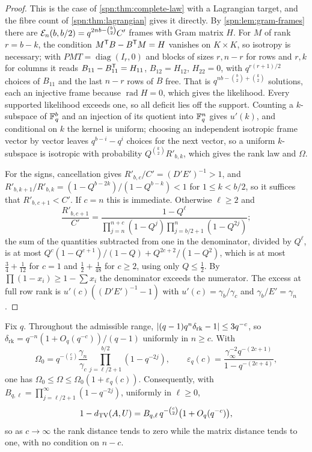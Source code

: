 \begin{proof}
This is the case of \cref{spn:thm:complete-law} with a Lagrangian target, and the fibre count of
\cref{spn:thm:lagrangian} gives it directly. By \cref{spn:lem:gram-frames} there are
$\mathcal{E}_n(b,b/2)=q^{2nb-\binom b2}C'$ frames with Gram matrix $H$. For $M$ of rank $r=b-k$, the
condition $M^{\mathsf{T}}B-B^{\mathsf{T}}M=H$ vanishes on $K\times K$, so isotropy is necessary; with
$PMT=\operatorname{diag}(I_r,0)$ and blocks of sizes $r,n-r$ for rows and $r,k$ for columns it reads
$B_{11}-B_{11}^{\mathsf{T}}=H_{11}$, $B_{12}=H_{12}$, $H_{22}=0$, with $q^{r(r+1)/2}$ choices of $B_{11}$ and
the last $n-r$ rows of $B$ free. That is $q^{nb-\binom b2+\binom k2}$ solutions, each an injective frame
because $\operatorname{rad}H=0$, which gives the likelihood. Every supported likelihood exceeds one, so
all deficit lies off the support. Counting a $k$-subspace of $\mathbb{F}_q^b$ and an injection of its quotient
into $\mathbb{F}_q^n$ gives $u'(k)$, and conditional on $k$ the kernel is uniform; choosing an independent
isotropic frame vector by vector leaves $q^{b-i}-q^i$ choices for the next vector, so a uniform
$k$-subspace is isotropic with probability $Q^{\binom k2}R'_{b,k}$, which gives the rank law and
$\Omega$.

For the signs, cancellation gives $R'_{b,c}/C'=(D'E')^{-1}>1$, and
$R'_{b,k+1}/R'_{b,k}=(1-Q^{b-2k})/(1-Q^{b-k})<1$ for $1\le k<b/2$, so it suffices that
$R'_{b,c+1}<C'$. If $c=n$ this is immediate. Otherwise $\ell\ge2$ and
\[
 \frac{R'_{b,c+1}}{C'}=\frac{1-Q^{\ell}}{\prod_{j=n}^{n+c}(1-Q^j)\prod_{j=b/2+1}^{n}(1-Q^{2j})};
\]
the sum of the quantities subtracted from one in the denominator, divided by $Q^\ell$, is at most
$Q^c(1-Q^{c+1})/(1-Q)+Q^{2c+2}/(1-Q^2)$, which is at most $\tfrac34+\tfrac1{12}$ for $c=1$ and
$\tfrac12+\tfrac1{48}$ for $c\ge2$, using only $Q\le\tfrac12$. By $\prod(1-x_i)\ge1-\sum x_i$ the
denominator exceeds the numerator. The excess at full row rank is
$u'(c)((D'E')^{-1}-1)$ with $u'(c)=\gamma_b/\gamma_c$ and $\gamma_b/E'=\gamma_n$.
\end{proof}

\begin{theorem}\label{spn:thm:wide-separation}
Fix $q$. Throughout the admissible range, $\lvert(q-1)q^n\delta_{\mathrm{rk}}-1\rvert\le3q^{-c}$, so
$\delta_{\mathrm{rk}}=q^{-n}(1+O_q(q^{-c}))/(q-1)$ uniformly in $n\ge c$. With
\[
 \Omega_0=q^{-\binom c2}\frac{\gamma_n}{\gamma_c}\prod_{j=\ell/2+1}^{b/2}(1-q^{-2j}),\qquad
 \varepsilon_q(c)=\frac{\gamma_\infty^{-2}q^{-(2c+1)}}{1-q^{-(2c+4)}},
\]
one has $\Omega_0\le\Omega\le\Omega_0(1+\varepsilon_q(c))$. Consequently, with
$B_{q,\ell}=\prod_{j=\ell/2+1}^\infty(1-q^{-2j})$, uniformly in $\ell\ge0$,
\[
 1-d_{\mathrm{TV}}(A,U)=B_{q,\ell}\,q^{-\binom c2}\bigl(1+O_q(q^{-c})\bigr),
\]
so as $c\to\infty$ the rank distance tends to zero while the matrix distance tends to one, with no
condition on $n-c$.
\end{theorem}

